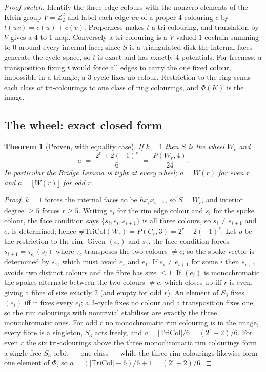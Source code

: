 \documentclass[11pt]{article}
\newtheorem{theorem}{Theorem}[section]
\theoremstyle{definition}
\begin{document}
\begin{proof}[Proof sketch]
Identify the three edge colours with the nonzero elements of the Klein group
$V=\mathbb{Z}_2^2$ and label each edge $uv$ of a proper $4$-colouring $c$ by
$t(uv)=c(u)+c(v)$. Properness makes $t$ a tri-colouring, and translation by $V$ gives
a $4$-to-$1$ map. Conversely a tri-colouring is a $V$-valued $1$-cochain summing to
$0$ around every internal face; since $S$ is a triangulated disk the internal faces
generate the cycle space, so $t$ is exact and has exactly $4$ potentials. For
freeness: a transposition fixing $t$ would force all edges to carry the one fixed
colour, impossible in a triangle; a $3$-cycle fixes no colour. Restriction to the ring
sends each class of tri-colourings to one class of ring colourings, and $\Phi(K)$ is
the image.
\end{proof}

\subsection{The wheel: exact closed form}

\begin{theorem}[Proven, with equality case]
\label{thm:wheel}
If $k=1$ then $S$ is the wheel $W_r$ and
\[
   a \;=\; \frac{2^r + 2(-1)^r}{6} \;=\; \frac{P(W_r,4)}{24}.
\]
In particular the Bridge Lemma is \emph{tight} at every wheel; $a = W(r)$ for even
$r$ and $a = \lfloor W(r)\rfloor$ for odd $r$.
\end{theorem}

\begin{proof}
$k=1$ forces the internal faces to be $h x_i x_{i+1}$, so $S=W_r$, and interior
degree $\ge5$ forces $r\ge5$. Writing $e_i$ for the rim edge colour and $s_i$ for the
spoke colour, the face condition says $\{s_i,e_i,s_{i+1}\}$ is all three colours, so
$s_i\ne s_{i+1}$ and $e_i$ is determined; hence
$\#\mathrm{TriCol}(W_r) = P(C_r,3) = 2^r+2(-1)^r$.
Let $\rho$ be the restriction to the rim. Given $(e_i)$ and $s_1$, the face condition
forces $s_{i+1} = \tau_{e_i}(s_i)$ where $\tau_c$ transposes the two colours $\ne c$;
so the spoke vector is determined by $s_1$, which must avoid $e_r$ and $e_1$. If
$e_i \ne e_{i+1}$ for some $i$ then $s_{i+1}$ avoids two distinct colours and the
fibre has size $\le1$. If $(e_i)$ is monochromatic the spokes alternate between the
two colours $\ne c$, which closes up iff $r$ is even, giving a fibre of size exactly
$2$ (and empty for odd $r$). An element of $S_3$ fixes $(e_i)$ iff it fixes every
$e_i$; a $3$-cycle fixes no colour and a transposition fixes one, so the rim
colourings with nontrivial stabiliser are exactly the three monochromatic ones.
For odd $r$ no monochromatic rim colouring is in the image, every fibre is a
singleton, $S_3$ acts freely, and $a = |\mathrm{TriCol}|/6=(2^r-2)/6$. For even $r$
the six tri-colourings above the three monochromatic rim colourings form a single
free $S_3$-orbit --- one class --- while the three rim colourings likewise form one
element of $\Phi$, so $a = (|\mathrm{TriCol}|-6)/6 + 1 = (2^r+2)/6$.
\end{proof}
\end{document}
